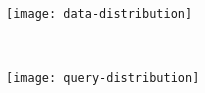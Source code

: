 \begin{figure}[!ht]
	\centering
	\begin{minipage}{0.48\columnwidth}
		\centering
		\texttt{[image: data-distribution]}
		\label{figure:data-distribution}
	\end{minipage}
	~ %
	\begin{minipage}{0.48\columnwidth}
		\centering
		\texttt{[image: query-distribution]}
		\label{figure:query-distribution}
	\end{minipage}
\end{figure}
